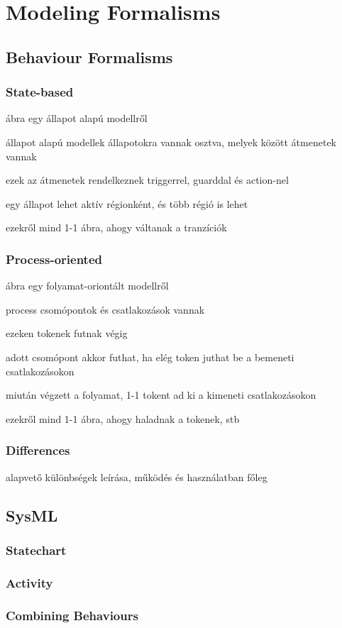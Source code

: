 \section{Modeling Formalisms}\label{sec:formalisms}

\subsection{Behaviour Formalisms}

\subsubsection{State-based}

ábra egy állapot alapú modellről

állapot alapú modellek állapotokra vannak osztva, melyek között átmenetek vannak

ezek az átmenetek rendelkeznek triggerrel, guarddal és action-nel

egy állapot lehet aktív régionként, és több régió is lehet

ezekről mind 1-1 ábra, ahogy váltanak a tranzíciók

\subsubsection{Process-oriented}

ábra egy folyamat-oriontált modellről

process csomópontok és csatlakozások vannak

ezeken tokenek futnak végig

adott csomópont akkor futhat, ha elég token juthat be a bemeneti csatlakozásokon

miután végzett a folyamat, 1-1 tokent ad ki a kimeneti csatlakozásokon

ezekről mind 1-1 ábra, ahogy haladnak a tokenek, stb

\subsubsection{Differences}

alapvető különbségek leírása, működés és használatban főleg

\subsection{SysML}

\subsubsection{Statechart}

\subsubsection{Activity}

\subsubsection{Combining Behaviours}